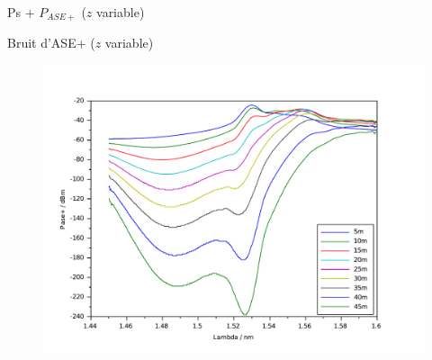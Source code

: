 \documentclass{beamer}
\begin{document}
\begin{frame}{Ps + $P_{ASE+}$ ($z$ variable)}

\end{frame}


\begin{frame}{Bruit d'ASE+ ($z$ variable)}

\begin{figure}
    \centering
    \includegraphics[width=\textwidth]{bruit.pdf}
\end{figure}

\end{frame}
\end{document}
